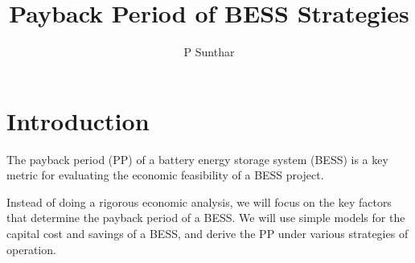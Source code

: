 \documentclass[a4paper]{article}
\begin{document}
\title{Payback Period of BESS Strategies}
\author{P Sunthar}

\maketitle



\section{Introduction}

The payback period (PP) of a battery energy storage system
(BESS) is a key metric for evaluating the economic feasibility of a
BESS project. 

Instead of doing a rigorous economic analysis, we will focus on the key
factors that determine the payback period of a BESS. We will use simple models
for the capital cost and savings of a BESS, and derive the PP under
various strategies of operation.






\end{document}

